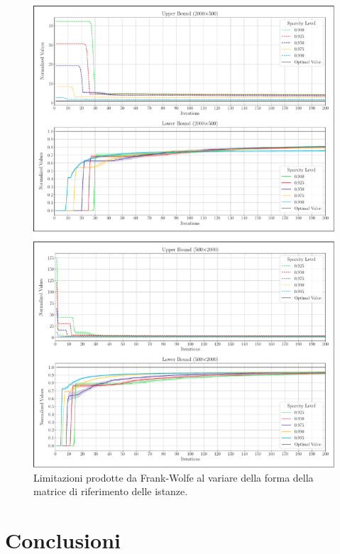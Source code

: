 \begin{figure}[H]
    \centering
    \includegraphics[width=412pt]{assets/figures/conv_shape2.pdf}
    \caption{Limitazioni prodotte da Frank-Wolfe al variare della forma della matrice di riferimento delle istanze.}
    \label{fig:shape_lineplot}
\end{figure}

\section{Conclusioni}
